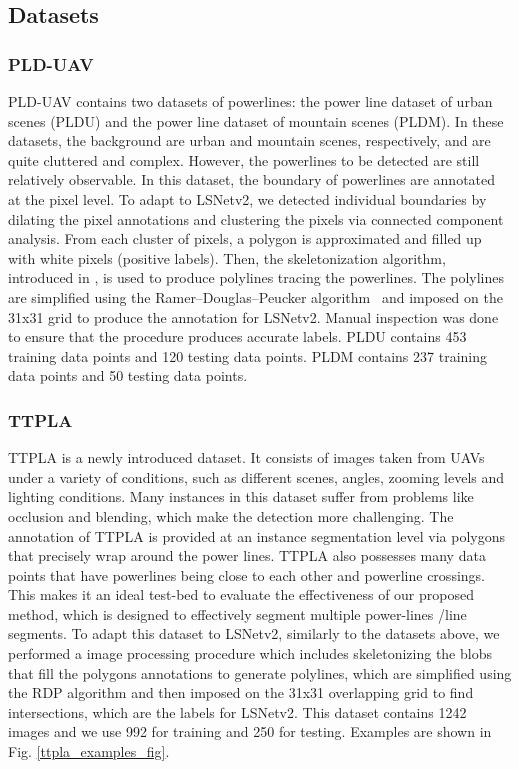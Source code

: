 \documentclass[journal]{IEEEtran}
\newcommand{\commentM}[1]{\textbf{\textcolor{blue}{M: #1}}}
\begin{document}
\subsection{Datasets}

\subsubsection{PLD-UAV}

PLD-UAV \cite{PLD_UAV} contains two datasets of powerlines: the power line dataset of urban scenes (PLDU) and the power line dataset of mountain scenes (PLDM). In these datasets, the background are urban and mountain scenes, respectively, and are quite cluttered and complex. However, the powerlines to be detected are still relatively observable. In this dataset, the boundary of powerlines are annotated at the pixel level. To adapt to LSNetv2, we detected individual boundaries by dilating the pixel annotations and clustering the pixels via connected component analysis. From each cluster of pixels, a polygon is approximated and filled up with white pixels (positive labels). Then, the skeletonization algorithm, introduced in \cite{skeleton}, is used to produce polylines tracing the powerlines. The polylines are simplified using the Ramer–Douglas–Peucker algorithm~\cite{RDP} and imposed on the 31x31 grid to produce the annotation for LSNetv2. Manual inspection was done to ensure that the procedure produces accurate labels. PLDU contains 453 training data points and 120 testing data points. PLDM contains 237 training data points and 50 testing data points.

\subsubsection{TTPLA}

TTPLA \cite{TTPLA} is a newly introduced dataset. It consists of images taken from UAVs under a variety of conditions, such as different scenes, angles, zooming levels and lighting conditions. Many instances in this dataset suffer from problems like occlusion and blending, which make the detection more challenging. The annotation of TTPLA is provided at an instance segmentation level via polygons that precisely wrap around the power lines. TTPLA also possesses many data points that have powerlines being close to each other and powerline crossings. This makes it an ideal test-bed to evaluate the effectiveness of our proposed method, which is designed to effectively segment multiple power-lines /line segments. To adapt this dataset to LSNetv2, similarly to the datasets above, we performed a image processing procedure which includes skeletonizing the blobs that fill the polygons annotations to generate polylines, which are simplified using the RDP algorithm and then imposed on the 31x31 overlapping grid to find intersections, which are the labels for LSNetv2. This dataset contains 1242 images and we use 992 for training and 250 for testing. Examples are shown in Fig. \ref{ttpla_examples_fig}.
\end{document}
